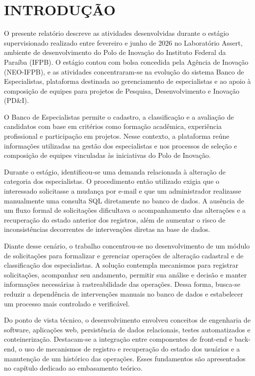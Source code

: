 
\chapter{INTRODUÇÃO}
\label{chap:introducao}

O presente relatório descreve as atividades desenvolvidas durante o estágio 
supervisionado realizado entre fevereiro e junho de 2026 no Laboratório Assert, 
ambiente de desenvolvimento do Polo de Inovação do Instituto Federal da Paraíba (IFPB). 
O estágio contou com bolsa concedida pela Agência de Inovação (NEO-IFPB), e as atividades 
concentraram-se na evolução do sistema Banco de Especialistas, plataforma destinada ao 
gerenciamento de especialistas e ao apoio à composição de equipes para projetos de 
Pesquisa, Desenvolvimento e Inovação (PD\&I).

O Banco de Especialistas permite o cadastro, a classificação e a avaliação 
de candidatos com base em critérios como formação acadêmica, experiência 
profissional e participação em projetos. Nesse contexto, a plataforma 
reúne informações utilizadas na gestão dos especialistas e nos processos 
de seleção e composição de equipes vinculadas às iniciativas do Polo de Inovação.

Durante o estágio, identificou-se uma demanda relacionada à alteração de 
categoria dos especialistas. O procedimento então utilizado exigia que o 
interessado solicitasse a mudança por e-mail e que um administrador realizasse 
manualmente uma consulta SQL diretamente no banco de dados. A ausência de 
um fluxo formal de solicitações dificultava o acompanhamento das alterações 
e a recuperação do estado anterior dos registros, além de aumentar o risco de 
inconsistências decorrentes de intervenções diretas na base de dados.

Diante desse cenário, o trabalho concentrou-se no desenvolvimento de um 
módulo de solicitações para formalizar e gerenciar operações de alteração 
cadastral e de classificação dos especialistas. A solução contempla mecanismos 
para registrar solicitações, acompanhar seu andamento, permitir sua análise 
e decisão e manter informações necessárias à rastreabilidade das operações. 
Dessa forma, busca-se reduzir a dependência de intervenções manuais no banco 
de dados e estabelecer um processo mais controlado e verificável.

Do ponto de vista técnico, o desenvolvimento envolveu conceitos de engenharia 
de software, aplicações web, persistência de dados relacionais, testes 
automatizados e conteinerização. Destacam-se a integração entre componentes 
de front-end e back-end, o uso de mecanismos de registro e recuperação do 
estado dos usuários e a manutenção de um histórico das operações. Esses 
fundamentos são apresentados no capítulo dedicado ao embasamento teórico.






